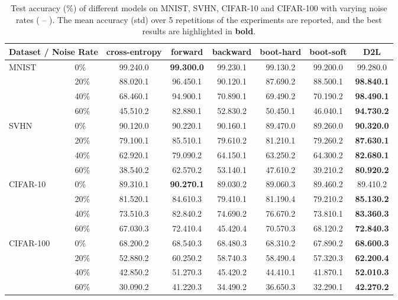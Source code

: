 \documentclass{article}
\begin{document}
\begin{table*}[!tb]
\renewcommand{\arraystretch}{1.1}
\centering
\small
\caption{Test accuracy (\%) of different models on MNIST, SVHN, CIFAR-10 and CIFAR-100 with varying noise rates ( -- ). The mean accuracy (std) over 5 repetitions of the experiments are reported, and the best results are highlighted in \textbf{bold}.}
\label{tb:experiment_sym}
\begin{tabular}{ll|cccccc}
\hline
\multicolumn{2}{c|}{Dataset / Noise Rate} & cross-entropy & forward & backward & boot-hard & boot-soft & D2L  \\ \hline
\multirow{4}{*}{MNIST} 
& 0\% & 99.240.0 & \textbf{99.300.0} & 99.230.1 & 99.130.2 & 99.200.0 & 99.280.0  \\
& 20\% & 88.020.1 & 96.450.1 & 90.120.1 & 87.690.2 & 88.500.1 & \textbf{98.840.1}  \\
& 40\% & 68.460.1  & 94.900.1 & 70.890.1  & 69.490.2 & 70.190.2 & \textbf{98.490.1}  \\
& 60\% & 45.510.2 & 82.880.1 & 52.830.2 & 50.450.1 & 46.040.1 & \textbf{94.730.2}  \\ \hline
\multirow{4}{*}{SVHN}
& 0\% & 90.120.0 & 90.220.1 & 90.160.1 & 89.470.0 & 89.260.0 & \textbf{90.320.0} \\
& 20\% & 79.100.1 & 85.510.1 & 79.610.2 & 81.210.1 & 79.260.2 & \textbf{87.630.1}  \\
& 40\% & 62.920.1  & 79.090.2 & 64.150.1 & 63.250.2 & 64.300.2 & \textbf{82.680.1}  \\
& 60\% & 38.540.2 & 62.570.2 & 53.140.1 & 47.610.2 & 39.210.2 & \textbf{80.920.2}  \\ \hline
\multirow{4}{*}{CIFAR-10}
& 0\% & 89.310.1 & \textbf{90.270.1} & 89.030.2 & 89.060.3 & 89.460.2 & 89.410.2  \\
& 20\% & 81.520.1  & 84.610.3 & 79.410.1 & 81.190.4 & 79.210.2 & \textbf{85.130.2}  \\
& 40\% & 73.510.3  & 82.840.2 & 74.690.2 & 76.670.2 & 73.810.1 & \textbf{83.360.3}  \\
& 60\% & 67.030.3  & 72.410.4 & 45.420.4 & 70.570.3 & 68.120.2 & \textbf{72.840.3}  \\
\hline
\multirow{4}{*}{CIFAR-100}
& 0\% & 68.200.2 & 68.540.3 & 68.480.3 & 68.310.2 & 67.890.2 & \textbf{68.600.3}  \\
& 20\% & 52.880.2  & 60.250.2 & 58.740.3 & 58.490.4 & 57.320.3 & \textbf{62.200.4}  \\
& 40\% & 42.850.2  & 51.270.3 & 45.420.2 & 44.410.1 & 41.870.1 & \textbf{52.010.3}  \\
& 60\% & 30.090.2  & 41.220.3 & 34.490.2 & 36.650.3 & 32.290.1 & \textbf{42.270.2}  \\
\hline
\end{tabular}
\end{table*}
\end{document}
